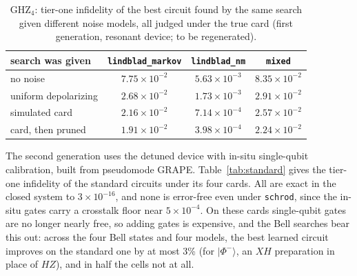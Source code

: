 \documentclass[10pt]{article}
\begin{document}
\begin{table}[htbp]
\centering
\caption{GHZ$_4$: tier-one infidelity of the best circuit found by the same
search given different noise models, all judged under the true card (first
generation, resonant device; to be regenerated).}
\label{tab:naive}
\small
\begin{tabular}{lccc}
\toprule
search was given & \texttt{lindblad\_markov} & \texttt{lindblad\_nm} & \texttt{mixed} \\
\midrule
no noise              & $7.75\times10^{-2}$ & $5.63\times10^{-3}$ & $8.35\times10^{-2}$ \\
uniform depolarizing  & $2.68\times10^{-2}$ & $1.73\times10^{-3}$ & $2.91\times10^{-2}$ \\
simulated card        & $2.16\times10^{-2}$ & $7.14\times10^{-4}$ & $2.57\times10^{-2}$ \\
card, then pruned     & $1.91\times10^{-2}$ & $3.98\times10^{-4}$ & $2.24\times10^{-2}$ \\
\bottomrule
\end{tabular}
\end{table}

The second generation uses the detuned device with in-situ single-qubit
calibration, built from pseudomode GRAPE. Table~\ref{tab:standard} gives the
tier-one infidelity of the standard circuits under its four cards. All are
exact in the closed system to $3\times10^{-16}$, and none is error-free even
under \texttt{schrod}, since the in-situ gates carry a crosstalk floor near
$5\times10^{-4}$. On these cards single-qubit gates are no longer nearly free,
so adding gates is expensive, and the Bell searches bear this out: across the
four Bell states and four models, the best learned circuit improves on the
standard one by at most 3\% (for $|\Phi^-\rangle$, an $XH$ preparation in place
of $HZ$), and in half the cells not at all.
\end{document}
